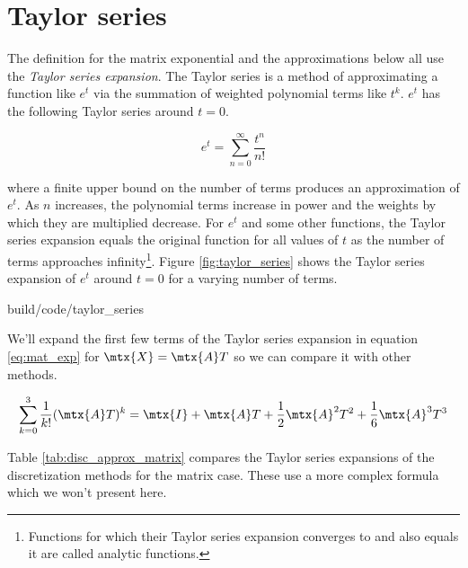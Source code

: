 \section{Taylor series}
The definition for the matrix exponential and the approximations below all use
the \textit{Taylor series expansion}. The Taylor series is a method of
approximating a function like $e^t$ via the summation of weighted polynomial
terms like $t^k$. $e^t$ has the following Taylor series around $t = 0$.

\begin{equation*}
  e^t = \sum_{n = 0}^\infty \frac{t^n}{n!}
\end{equation*}

where a finite upper bound on the number of terms produces an approximation of
$e^t$. As $n$ increases, the polynomial terms increase in power and the weights
by which they are multiplied decrease. For $e^t$ and some other functions, the
Taylor series expansion equals the original function for all values of $t$ as
the number of terms approaches infinity\footnote{Functions for which their
Taylor series expansion converges to and also equals it are called analytic
functions.}. Figure \ref{fig:taylor_series} shows the Taylor series expansion of
$e^t$ around $t = 0$ for a varying number of terms.

\begin{svg}{build/code/taylor_series}
  \caption{Taylor series expansions of $e^t$ around $t = 0$ for $n$ terms}
  \label{fig:taylor_series}
\end{svg}

We'll expand the first few terms of the Taylor series expansion in equation
\eqref{eq:mat_exp} for $\mtx{X} = \mtx{A}T$ so we can compare it with other
methods.

\begin{equation*}
  \sum_{k=0}^3 \frac{1}{k!} (\mtx{A}T)^k = \mtx{I} + \mtx{A}T +
    \frac{1}{2}\mtx{A}^2T^2 + \frac{1}{6}\mtx{A}^3T^3
\end{equation*}

Table \ref{tab:disc_approx_matrix} compares the Taylor series expansions of the
\gls{discretization} methods for the matrix case. These use a more complex
formula which we won't present here.

